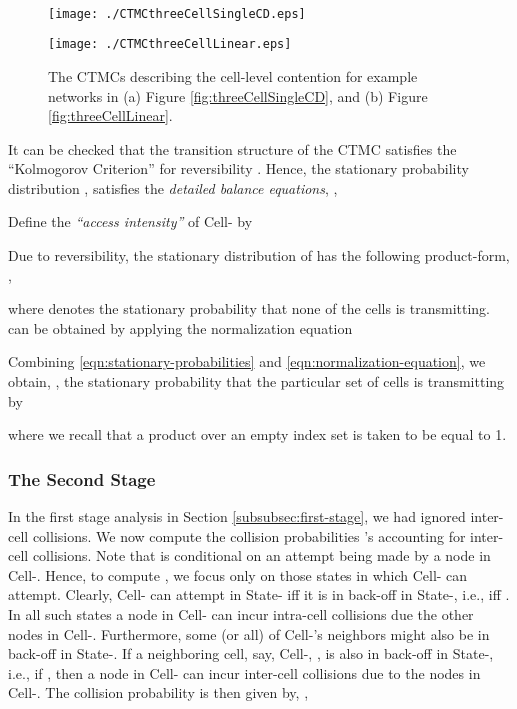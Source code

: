 \documentclass[10pt,a4paper,journal]{IEEEtran}
\theoremstyle{definition}
\theoremstyle{remark}
\theoremstyle{plain}
\begin{document}
\begin{figure}[tb]
  \centering \
  \begin{minipage}{3.5cm}
    \begin{center}
      \texttt{[image: ./CTMCthreeCellSingleCD.eps]}
      \subfigure[]{\label{fig:CTMCthreeCellSingleCD}}
    \end{center}
  \end{minipage}
  \hspace{0.5cm}
  \begin{minipage}{3.5cm}
    \begin{center}      \texttt{[image: ./CTMCthreeCellLinear.eps]}
      \subfigure[]{\label{fig:CTMCthreeCellLinear}}
    \end{center}
  \end{minipage}
  \caption{The CTMCs describing the cell-level contention for example
    networks in (a) Figure \ref{fig:threeCellSingleCD}, and (b) Figure
    \ref{fig:threeCellLinear}.}
\end{figure}


It can be checked that the transition structure of the CTMC  satisfies the ``Kolmogorov Criterion'' for reversibility \cite{theory.kelly79reversibility}. Hence, the stationary probability distribution , satisfies the \textit{detailed balance equations}, , 


Define the \textit{``access intensity''}  of Cell- by 
 
Due to reversibility, the stationary distribution of  has the following product-form, , 
 
where  denotes the stationary probability that none of the cells is transmitting.  can be obtained by applying the normalization equation 



Combining \eqref{eqn:stationary-probabilities} and \eqref{eqn:normalization-equation}, we obtain, , the stationary probability  that the particular set  of cells is transmitting by 
 
where we recall that a product  over an empty index set is taken to be equal to 1.



\subsubsection{The Second Stage}
\label{subsubsec:second-stage}

In the first stage analysis in Section \ref{subsubsec:first-stage}, we had ignored inter-cell collisions. We now compute the collision probabilities 's accounting for inter-cell collisions.  Note that  is conditional on an attempt being made by a node in Cell-. Hence, to compute , we focus only on those states in which Cell- can attempt. Clearly, Cell- can attempt in State- iff it is in back-off in State-, i.e., iff . In all such states a node in Cell- can incur intra-cell collisions due the other nodes in Cell-. Furthermore, some (or all) of Cell-'s neighbors might also be in back-off in State-.  If a neighboring cell, say, Cell-, , is also in back-off in State-, i.e., if , then a node in Cell- can incur inter-cell collisions due to the nodes in Cell-.  The collision probability  is then given by, , 
 
\end{document}
